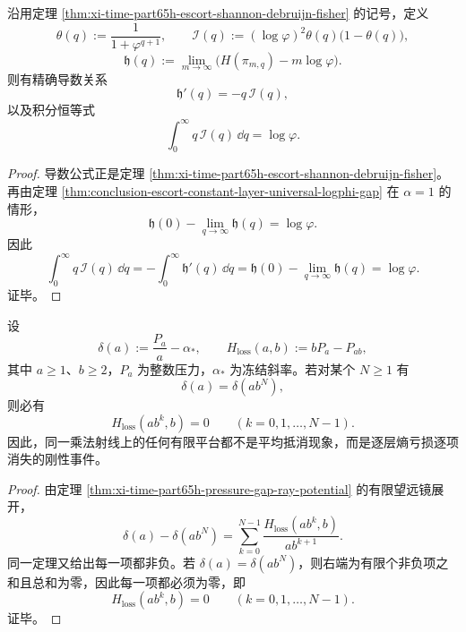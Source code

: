 \begin{corollary}\label{cor:conclusion-escort-fisher-total-mass-logphi}
沿用定理 \ref{thm:xi-time-part65h-escort-shannon-debruijn-fisher} 的记号，定义
\[
\theta(q):=\frac{1}{1+\varphi^{q+1}},
\qquad
\mathcal I(q):=(\log\varphi)^2\theta(q)\bigl(1-\theta(q)\bigr),
\]
\[
\mathfrak h(q):=\lim_{m\to\infty}\bigl(H(\pi_{m,q})-m\log\varphi\bigr).
\]
则有精确导数关系
\[
\mathfrak h'(q)=-q\,\mathcal I(q),
\]
以及积分恒等式
\[
\boxed{\;
\int_0^\infty q\,\mathcal I(q)\,\dd q=\log\varphi.\;}
\]
\end{corollary}
\begin{proof}
导数公式正是定理 \ref{thm:xi-time-part65h-escort-shannon-debruijn-fisher}。再由定理 \ref{thm:conclusion-escort-constant-layer-universal-logphi-gap} 在 \(\alpha=1\) 的情形，
\[
\mathfrak h(0)-\lim_{q\to\infty}\mathfrak h(q)=\log\varphi.
\]
因此
\[
\int_0^\infty q\,\mathcal I(q)\,\dd q
=
-\int_0^\infty \mathfrak h'(q)\,\dd q
=
\mathfrak h(0)-\lim_{q\to\infty}\mathfrak h(q)
=
\log\varphi.
\]
证毕。
\end{proof}

\begin{theorem}[乘法射线上的有限平台刚性]\label{thm:conclusion-multiplicative-ray-finite-plateau-rigidity}
设
\[
\delta(a):=\frac{P_a}{a}-\alpha_*,
\qquad
H_{\mathrm{loss}}(a,b):=bP_a-P_{ab},
\]
其中 \(a\ge 1\)、\(b\ge 2\)，\(P_a\) 为整数压力，\(\alpha_*\) 为冻结斜率。若对某个 \(N\ge 1\) 有
\[
\delta(a)=\delta(ab^N),
\]
则必有
\[
\boxed{\;
H_{\mathrm{loss}}(ab^k,b)=0
\qquad
(k=0,1,\dots,N-1).\;}
\]
因此，同一乘法射线上的任何有限平台都不是平均抵消现象，而是逐层熵亏损逐项消失的刚性事件。
\end{theorem}
\begin{proof}
由定理 \ref{thm:xi-time-part65h-pressure-gap-ray-potential} 的有限望远镜展开，
\[
\delta(a)-\delta(ab^N)
=
\sum_{k=0}^{N-1}\frac{H_{\mathrm{loss}}(ab^k,b)}{ab^{k+1}}.
\]
同一定理又给出每一项都非负。若 \(\delta(a)=\delta(ab^N)\)，则右端为有限个非负项之和且总和为零，因此每一项都必须为零，即
\[
H_{\mathrm{loss}}(ab^k,b)=0
\qquad
(k=0,1,\dots,N-1).
\]
证毕。
\end{proof}

